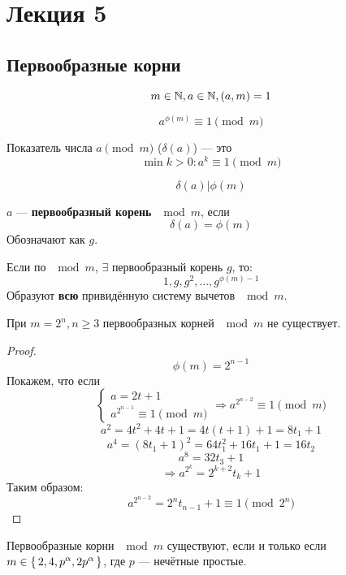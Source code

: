 \section{Лекция 5}
\subsection{Первообразные корни}
\[
  m \in \mathbb{N}, a \in \mathbb{N}, (a, m) = 1
\]
\begin{theorem}[Эйлера]
\label{theorem:04_4}
  \[
  a^{\phi(m)} \equiv 1 \pmod m
  \]
\end{theorem}
\begin{definition}
  Показатель числа $a \pmod m$ ($\delta(a)$) --- это
  \[
    \min k > 0 \colon a^{k} \equiv 1 \pmod m
  \]
\end{definition}
\begin{statement}
  \[
  \delta(a) | \phi(m)
  \]
\end{statement}
\begin{definition}
  $a$ --- \textbf{первообразный корень} $\mod m$, если
  \[
    \delta(a) = \phi(m)
  \]
  Обозначают как $g$.
\end{definition}
\begin{statement}
Если по $\mod m$, $\exists $ первообразный корень $g$, то:
\[
  1, g, g^{2}, \ldots, g^{\phi(m) - 1}
\]
Образуют \textbf{всю} привидённую систему вычетов $\mod m$.
\end{statement}
\begin{statement}
При $m = 2^{n}, n \geq 3$ первообразных корней $\mod m$ не существует.
\end{statement}
\begin{proof}
  \[
  \phi(m) = 2^{n - 1}
  \]
Покажем, что если
\[
  \begin{cases}
  a = 2t + 1 \\
  a^{2^{n - 1}}  \equiv 1 \pmod m
  \end{cases} \Rightarrow a^{2^{n - 2}} \equiv 1 \pmod m
\]
\[
a^{2} = 4t^{2} + 4t + 1 = 4t(t + 1) + 1 = 8t_1 + 1
\]
\[
a^{4} = (8t_1 + 1)^{2} = 64t_1^{2} + 16t_1 + 1 = 16t_2
\]
\[
a^{8} = 32t_3 + 1
\]
\[
\Rightarrow a^{2^{k}} = 2^{k + 2}t_k + 1
\]
Таким образом:
\[
a^{2^{n - 2}} = 2^{n}t_{n - 1} + 1 \equiv 1 \pmod 2^{n} 
\]
\end{proof}
\begin{theorem}
\label{theorem:05_1}
Первообразные корни $\mod m$ существуют, если и только если $m \in \set{2, 4, p ^{\alpha}, 2p ^{\alpha}}$, где $p$ --- нечётные простые.
\end{theorem}

